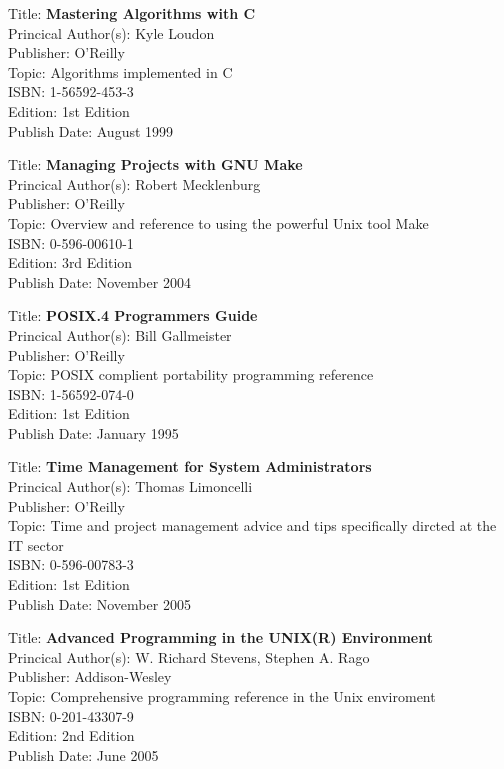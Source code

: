 Title: 	\textbf{Mastering Algorithms with C}	\\
Princical Author(s): 	Kyle Loudon  \\
Publisher:	O'Reilly	\\	
Topic:		Algorithms implemented in C \\
ISBN:			1-56592-453-3 \\
Edition:		1st Edition \\
Publish Date:		August 1999


Title: 	\textbf{Managing Projects with GNU Make}	\\
Princical Author(s): 	Robert Mecklenburg  \\
Publisher:	O'Reilly	\\	
Topic:		Overview and reference to using the powerful Unix tool Make \\
ISBN:			0-596-00610-1 \\
Edition:		3rd Edition \\
Publish Date:		November 2004

	
Title: 	\textbf{POSIX.4 Programmers Guide}	\\
Princical Author(s): 	Bill Gallmeister  \\
Publisher:	O'Reilly	\\	
Topic:		POSIX complient portability programming reference \\
ISBN:			1-56592-074-0 \\
Edition:		1st Edition \\
Publish Date:		January 1995

	
Title: 	\textbf{Time Management for System Administrators}	\\
Princical Author(s): 	Thomas Limoncelli  \\
Publisher:	O'Reilly	\\	
Topic:		Time and project management advice and tips specifically dircted at the IT sector \\
ISBN:			0-596-00783-3 \\
Edition:		1st Edition \\
Publish Date:		November 2005

	
Title: 	\textbf{Advanced Programming in the UNIX(R) Environment}	\\
Princical Author(s): 	W. Richard Stevens, Stephen A. Rago  \\
Publisher:	Addison-Wesley	\\	
Topic:		Comprehensive programming reference in the Unix enviroment \\
ISBN:			0-201-43307-9 \\
Edition:		2nd Edition \\
Publish Date:		June 2005


